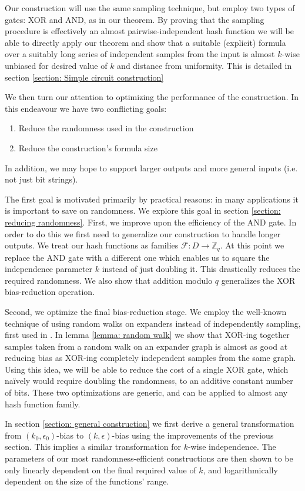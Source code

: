 \documentclass[12pt]{article}
\newcommand{\F}{\mathcal{F}}
\newcommand{\Z}{\mathbb{Z}}
\begin{document}
	Our construction will use the same sampling technique, but employ two types of gates: XOR and AND, as in our theorem.
	By proving that the sampling procedure is effectively an almost pairwise-independent hash function we will be able to directly apply our theorem and show that a suitable (explicit) formula over a suitably long series of independent samples from the input is almost $k$-wise unbiased for desired value of $k$ and distance from uniformity.
	This is detailed in section \ref{section: Simple circuit construction}
	
	We then turn our attention to optimizing the performance of the construction.
	In this endeavour we have two conflicting goals:
	\begin{enumerate}
		\item Reduce the randomness used in the construction
		\item Reduce the construction's formula size
	\end{enumerate}
	In addition, we may hope to support larger outputs and more general inputs (i.e. not just bit strings).
	
	The first goal is motivated primarily by practical reasons: in many applications it is important to save on randomness.
	We explore this goal in section \ref{section: reducing randomness}.
	First, we improve upon the efficiency of the AND gate.
	In order to do this we first need to generalize our construction to handle longer outputs.
	We treat our hash functions as families $\F : D \rightarrow \Z_q$.
	At this point we replace the AND gate with a different one which enables us to square the independence parameter $k$ instead of just doubling it.
	This drastically reduces the required randomness.
	We also show that addition modulo $q$ generalizes the XOR bias-reduction operation.
	
	Second, we optimize the final bias-reduction stage.
	We employ the well-known technique of using random walks on expanders instead of independently sampling, first used in \cite{RandomWalk}.
	In lemma \ref{lemma: random walk} we show that XOR-ing together samples taken from a random walk on an expander graph is almost as good at reducing bias as XOR-ing completely independent samples from the same graph.
	Using this idea, we will be able to reduce the cost of a single XOR gate, which na\"{i}vely would require doubling the randomness, to an additive constant number of bits.
	These two optimizations are generic, and can be applied to almost any hash function family.
		
	In section \ref{section: general construction} we first derive a general transformation from $(k_0, \epsilon_0)$-bias to $(k,\epsilon)$-bias using the improvements of the previous section.
	This implies a similar transformation for $k$-wise independence.
	The parameters of our most randomness-efficient constructions are then shown to be only linearly dependent on the final required value of $k$, and logarithmically dependent on the size of the functions' range.
	
\end{document}
